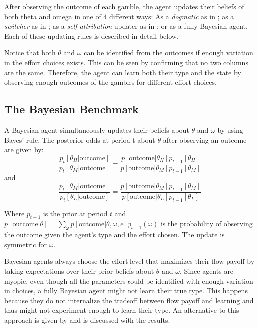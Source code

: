 \documentclass[
  12pt,
]{article}
\begin{document}
After observing the outcome of each gamble, the agent updates their
beliefs of both theta and omega in one of 4 different ways: As a
\emph{dogmatic} as in \citet{Heidhues2018} ; as a \emph{switcher} as in
\citet{Ba2023} ; as a \emph{self-attribution} updater as in
\citet{Coutts2020}; or as a fully Bayesian agent. Each of these updating
rules is described in detail below.

Notice that both \(\theta\) and \(\omega\) can be identified from the
outcomes if enough variation in the effort choices exists. This can be
seen by confirming that no two columns are the same. Therefore, the
agent can learn both their type and the state by observing enough
outcomes of the gambles for different effort choices.

\hypertarget{the-bayesian-benchmark}{%
\subsection{The Bayesian Benchmark}\label{the-bayesian-benchmark}}

A Bayesian agent simultaneously updates their beliefs about \(\theta\)
and \(\omega\) by using Bayes' rule. The posterior odds at period t
about \(\theta\) after observing an outcome are given by:
\begin{equation}
\frac{p_{t}[\theta_H|\text{outcome}]}{p_{t}[\theta_M|\text{outcome}]} = 
      \frac{p[\text{outcome}|\theta_H]p_{t-1}[\theta_H]}{p[\text{outcome}|\theta_M]p_{t-1}[\theta_M]}
\end{equation} and \begin{equation}
\frac{p_{t}[\theta_M|\text{outcome}]}{p_{t}[\theta_L|\text{outcome}]} = 
      \frac{p[\text{outcome}|\theta_M]p_{t-1}[\theta_M]}{p[\text{outcome}|\theta_L]p_{t-1}[\theta_L]}
\end{equation}

Where \(p_{t-1}\) is the prior at period \(t\) and
\(p[\text{outcome}|\theta] = \sum_{\omega} p[\text{outcome}|\theta, \omega, e]p_{t-1}(\omega)\)
is the probability of observing the outcome given the agent's type and
the effort chosen. The update is symmetric for \(\omega\).

Bayesian agents always choose the effort level that maximizes their flow
payoff by taking expectations over their prior beliefs about \(\theta\)
and \(\omega\). Since agents are myopic, even though all the parameters
could be identified with enough variation in choices, a fully Bayesian
agent might not learn their true type. This happens because they do not
internalize the tradeoff between flow payoff and learning and thus might
not experiment enough to learn their type. An alternative to this
approach is given by \citet{Hestermann2021} and is discussed with the
results.
\end{document}

